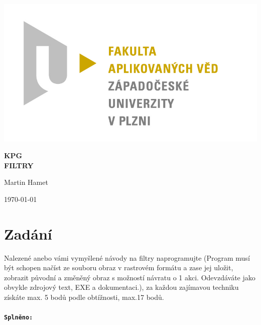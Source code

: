 \documentclass[12pt]{article}
\begin{document}
\begin{titlepage}
\includegraphics[scale=0.2, trim=5cm 0 0 30cm]{logo.jpg}
\begin{center}
\vspace{5cm}
{\Huge
\textbf{KPG}\\
\vspace{1cm}
}
{\Large
\textbf{FILTRY}
}
\end{center}
\vspace{\fill}

\begin{minipage}[t]{5cm}
\flushleft
Martin Hamet
\end{minipage}
\hfill
\begin{minipage}[t]{7cm}
\flushright
\today
\end{minipage}
\end{titlepage}

\tableofcontents
\newpage

\section{Zadání}
Nalezené anebo vámi vymyšlené návody na filtry naprogramujte (Program musí být schopen načíst ze souboru obraz v rastrovém formátu a zase jej uložit, zobrazit původní a změněný obraz s možností návratu o 1 akci. Odevzdáváte jako obvykle zdrojový text, EXE a dokumentaci.), za každou zajímavou techniku získáte max. 5 bodů podle obtížnosti,  max.17 bodů.

\paragraph{\texttt{Splněno:}}
\end{document}
